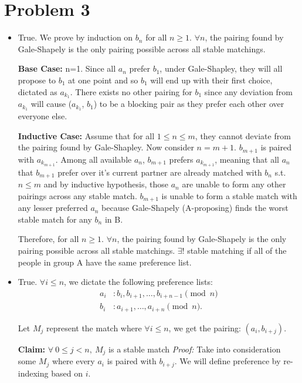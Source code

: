 \documentclass[12pt]{article}
\begin{document}
\section*{Problem 3}
\begin{itemize}
    \item[a)] True. We prove by induction on $b_n$ for all $n \geq 1$. $\forall n$, the pairing found by Gale-Shapely is the only pairing possible across all stable matchings.

     \textbf{Base Case:} n=1. Since all $a_n$ prefer $b_1$, under Gale-Shapley, they will all propose to $b_1$ at one point and so $b_1$ will end up with their first choice, dictated as $a_{k_1}$. There exists no other pairing for $b_1$ since any deviation from $a_{k_1}$ will cause ($a_{k_1}$, $b_1$) to be a blocking pair as they prefer each other over everyone else. 

    \textbf{  Inductive Case:} Assume that for all $1\leq n \leq m$, they cannot deviate from the pairing found by Gale-Shapley. Now consider $n = m+1$. $b_{m+1}$ is paired with $a_{k_{m+1}}$. Among all available $a_n$, $b_{m+1}$ prefers $a_{k_{m+1}}$, meaning that all $a_n$ that $b_{m+1}$ prefer over it's current partner are already matched with $b_n$ s.t. $n \leq m$ and by inductive hypothesis, those $a_n$ are unable to form any other pairings across any stable match. $b_{m+1}$ is unable to form a stable match with any lesser preferred $a_n$ because Gale-Shapely (A-proposing) finds the worst stable match for any $b_n$ in B. 

    \quad Therefore, for all $n \geq 1$. $\forall n$, the pairing found by Gale-Shapely is the only pairing possible across all stable matchings. $\exists!$ stable matching if all of the people in group A have the same preference list.


    \item[b)] True. $\forall i \leq n$, we dictate the following preference lists:
    \begin{align*}
        a_i&: b_i, b_{i+1},\dots, b_{i+n-1} \pmod{n} \\
        b_i &: a_{i+1},\dots, a_{i+n} \pmod{n}.
    \end{align*}
    
    Let $M_j$ represent the match where $\forall i \leq n$, we get the pairing: $(a_i, b_{i+j})$.

    \textbf{Claim:} $\forall ~0 \leq j < n, ~M_j$ is a stable match
    \newline \textit{Proof:} Take into consideration some $M_j$ where every $a_i$ is paired with $b_{i+j}$. We will define preference by re-indexing based on $i$.


\end{itemize}
\end{document}
